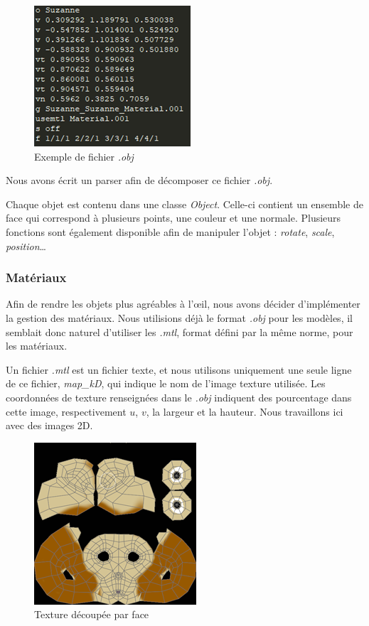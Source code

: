                 \begin{figure}[h]
                    \centering
                    \includegraphics[scale=0.8]{img/rendu/obj.png}
                    \caption{Exemple de fichier \emph{.obj}}
                    \label{fig:obj}
                \end{figure}
                Nous avons écrit un parser afin de décomposer ce fichier \emph{.obj}.

                Chaque objet est contenu dans une classe \emph{Object}. Celle-ci contient un ensemble de face qui correspond à plusieurs points, une couleur et une normale. Plusieurs fonctions sont également disponible afin de manipuler l'objet : \emph{rotate}, \emph{scale}, \emph{position}\dots

            \subsubsection{Matériaux}
            \label{subsubsec:materiaux}

            Afin de rendre les objets plus agréables à l'\oe il, nous avons décider d'implémenter la gestion des matériaux. Nous utilisions déjà le format \emph{.obj} pour les modèles, il semblait donc naturel d'utiliser les \emph{.mtl}, format défini par la même norme, pour les matériaux. 

            Un fichier \emph{.mtl} est un fichier texte, et nous utilisons uniquement une seule ligne de ce fichier, \emph{map\_kD}, qui indique le nom de l'image texture utilisée. Les coordonnées de texture renseignées dans le \emph{.obj} indiquent des pourcentage dans cette image, respectivement $u$, $v$, la largeur et la hauteur. Nous travaillons ici avec des images 2D.

            \begin{figure}[h]
                \centering
                \includegraphics[scale=0.8]{img/rendu/texture.png}
                \caption{Texture découpée par face}
                \label{fig:texture}
            \end{figure}

